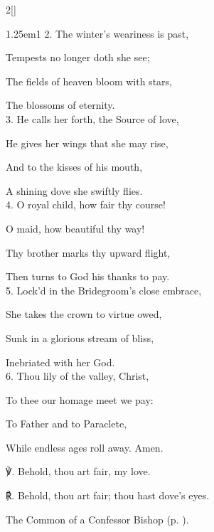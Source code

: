 \begin{paracol}{2}[]
\begin{hangparas}{1.25em}{1}
2. The winter's weariness is past,

Tempests no longer doth she see;

The fields of heaven bloom with stars,

The blossoms of eternity.\\

3. He calls her forth, the Source of love,

He gives her wings that she may rise,

And to the kisses of his mouth,

A shining dove she swiftly flies.\\

4. O royal child, how fair thy course!

O maid, how beautiful thy way!

Thy brother marks thy upward flight,

Then turns to God his thanks to pay.\\

5. Lock'd in the Bridegroom's close embrace,

She takes the crown to virtue owed,

Sunk in a glorious stream of bliss,

Inebriated with her God.\\

6. Thou lily of the valley, Christ,

To thee our homage meet we pay:

To Father and to Paraclete,

While endless ages roll away. Amen.\\
\end{hangparas}

℣. Behold, thou art fair, my love.  

℟. Behold, thou art fair; thou hast dove's eyes.


\end{paracol}



\begin{rubric}
	The Common of a Confessor Bishop (p. \pageref{ConfessorBishopCollect}).
\end{rubric}


